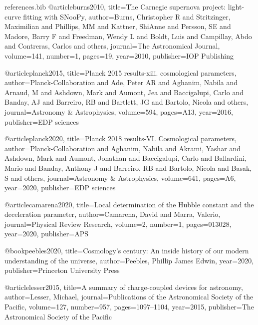 \documentclass[aps,prl,reprint,amsmath,floatfix]{revtex4-2}
\begin{document}
\begin{filecontents}{references.bib}
@article{burns2010,
  title={The Carnegie supernova project: light-curve fitting with SNooPy},
  author={Burns, Christopher R and Stritzinger, Maximilian and Phillips, MM and Kattner, ShiAnne and Persson, SE and Madore, Barry F and Freedman, Wendy L and Boldt, Luis and Campillay, Abdo and Contreras, Carlos and others},
  journal={The Astronomical Journal},
  volume={141},
  number={1},
  pages={19},
  year={2010},
  publisher={IOP Publishing}
}

@article{planck2015,
  title={Planck 2015 results-xiii. cosmological parameters},
  author={Planck-Collaboration and Ade, Peter AR and Aghanim, Nabila and Arnaud, M and Ashdown, Mark and Aumont, Jea and Baccigalupi, Carlo and Banday, AJ and Barreiro, RB and Bartlett, JG and Bartolo, Nicola and others},
  journal={Astronomy \& Astrophysics},
  volume={594},
  pages={A13},
  year={2016},
  publisher={EDP sciences}
}

@article{planck2020,
  title={Planck 2018 results-VI. Cosmological parameters},
  author={Planck-Collaboration and Aghanim, Nabila and Akrami, Yashar and Ashdown, Mark and Aumont, Jonathan and Baccigalupi, Carlo and Ballardini, Mario and Banday, Anthony J and Barreiro, RB and Bartolo, Nicola and Basak, S and others},
  journal={Astronomy \& Astrophysics},
  volume={641},
  pages={A6},
  year={2020},
  publisher={EDP sciences}
}

@article{camarena2020,
  title={Local determination of the Hubble constant and the deceleration parameter},
  author={Camarena, David and Marra, Valerio},
  journal={Physical Review Research},
  volume={2},
  number={1},
  pages={013028},
  year={2020},
  publisher={APS}
}

@book{peebles2020,
  title={Cosmology’s century: An inside history of our modern understanding of the universe},
  author={Peebles, Phillip James Edwin},
  year={2020},
  publisher={Princeton University Press}
}

@article{lesser2015,
  title={A summary of charge-coupled devices for astronomy},
  author={Lesser, Michael},
  journal={Publications of the Astronomical Society of the Pacific},
  volume={127},
  number={957},
  pages={1097--1104},
  year={2015},
  publisher={The Astronomical Society of the Pacific}
}
\end{filecontents}

\end{document}
